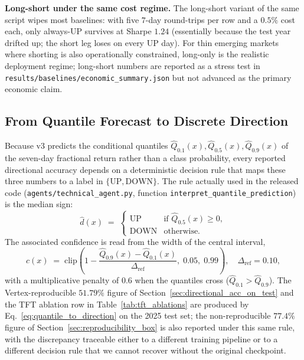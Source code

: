 \documentclass[conference]{IEEEtran}
\begin{document}
\textbf{Long-short under the same cost regime.} The long-short variant of the same script wipes most baselines: with five $7$-day round-trips per row and a $0.5\%$ cost each, only always-UP survives at Sharpe $1.24$ (essentially because the test year drifted up; the short leg loses on every UP day). For thin emerging markets where shorting is also operationally constrained, long-only is the realistic deployment regime; long-short numbers are reported as a stress test in \texttt{results/baselines/economic\_summary.json} but not advanced as the primary economic claim.

\subsection{From Quantile Forecast to Discrete Direction}\label{sec:quantile_to_direction}

Because v3 predicts the conditional quantiles $\hat{Q}_{0.1}(x), \hat{Q}_{0.5}(x), \hat{Q}_{0.9}(x)$ of the seven-day fractional return rather than a class probability, every reported directional accuracy depends on a deterministic decision rule that maps these three numbers to a label in $\{\mathrm{UP}, \mathrm{DOWN}\}$. The rule actually used in the released code (\texttt{agents/technical\_agent.py}, function \texttt{interpret\_quantile\_prediction}) is the median sign:
\begin{equation}
\hat{d}(x) \;=\; \begin{cases}
\mathrm{UP}   & \text{if } \hat{Q}_{0.5}(x) \geq 0, \\
\mathrm{DOWN} & \text{otherwise.}
\end{cases}
\label{eq:quantile_to_direction}
\end{equation}
The associated confidence is read from the width of the central interval,
\begin{equation}
c(x) \;=\; \mathrm{clip}\!\left(1 - \frac{\hat{Q}_{0.9}(x) - \hat{Q}_{0.1}(x)}{\Delta_{\mathrm{ref}}},\; 0.05,\; 0.99\right),
\quad \Delta_{\mathrm{ref}} = 0.10,
\label{eq:quantile_confidence}
\end{equation}
with a multiplicative penalty of $0.6$ when the quantiles cross ($\hat{Q}_{0.1} > \hat{Q}_{0.9}$). The Vertex-reproducible $51.79\%$ figure of Section~\ref{sec:directional_acc_on_test} and the TFT ablation row in Table~\ref{tab:tft_ablations} are produced by Eq.~\eqref{eq:quantile_to_direction} on the 2025 test set; the non-reproducible $77.4\%$ figure of Section~\ref{sec:reproducibility_box} is also reported under this same rule, with the discrepancy traceable either to a different training pipeline or to a different decision rule that we cannot recover without the original checkpoint.
\end{document}
